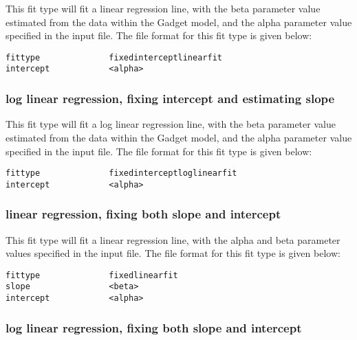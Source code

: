 \documentclass[]{book}
\begin{document}
This fit type will fit a linear regression line, with the beta parameter
value estimated from the data within the Gadget model, and the alpha
parameter value specified in the input file. The file format for this
fit type is given below:

\begin{verbatim}
fittype              fixedinterceptlinearfit
intercept            <alpha>
\end{verbatim}

\hypertarget{log-linear-regression-fixing-intercept-and-estimating-slope}{%
\subsubsection{log linear regression, fixing intercept and estimating slope}\label{log-linear-regression-fixing-intercept-and-estimating-slope}}

This fit type will fit a log linear regression line, with the beta
parameter value estimated from the data within the Gadget model, and the
alpha parameter value specified in the input file. The file format for
this fit type is given below:

\begin{verbatim}
fittype              fixedinterceptloglinearfit
intercept            <alpha>
\end{verbatim}

\hypertarget{linear-regression-fixing-both-slope-and-intercept}{%
\subsubsection{linear regression, fixing both slope and intercept}\label{linear-regression-fixing-both-slope-and-intercept}}

This fit type will fit a linear regression line, with the alpha and beta
parameter values specified in the input file. The file format for this
fit type is given below:

\begin{verbatim}
fittype              fixedlinearfit
slope                <beta>
intercept            <alpha>
\end{verbatim}

\hypertarget{log-linear-regression-fixing-both-slope-and-intercept}{%
\subsubsection{log linear regression, fixing both slope and intercept}\label{log-linear-regression-fixing-both-slope-and-intercept}}
\end{document}
